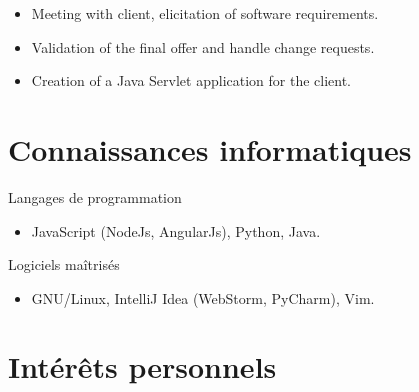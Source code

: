 \documentclass{res}
\newcommand{\inFrench}[1]{#1}
\newcommand{\inEnglish}[1]{}
\begin{document}
\begin{resume}
{	\begin{itemize} \itemsep -2pt
		\item Meeting with client, elicitation of software requirements.
		\item Validation of the final offer and handle change requests.
		\item Creation of a Java Servlet application for the client.
	\end{itemize}
}


\inFrench{
	\section{Connaissances informatiques}
}
\inEnglish{
	\section{Software expertise}
}
\vspace{6pt}

\inFrench{
	Langages de programmation
	\vspace{0.05in}
	\begin{itemize}
		\item JavaScript (NodeJs, AngularJs), Python, Java.
	\end{itemize}

	Logiciels maîtrisés
	\vspace{0.05in}
	\begin{itemize}
		\item GNU/Linux, IntelliJ Idea (WebStorm, PyCharm), Vim.
	\end{itemize}
}

\inEnglish{
	Programming languages
	\vspace{0.05in}
	\begin{itemize}
		\item JavaScript (NodeJs, AngularJs), Python, Java.
	\end{itemize}

	Softwares
	\vspace{0.05in}
	\begin{itemize}
		\item GNU/Linux, IntelliJ Idea (WebStorm, PyCharm), Vim.
	\end{itemize}
}

\newpage

\inFrench{
	\section{Intérêts personnels}
}
\inEnglish{
}
\end{resume}
\end{document}
